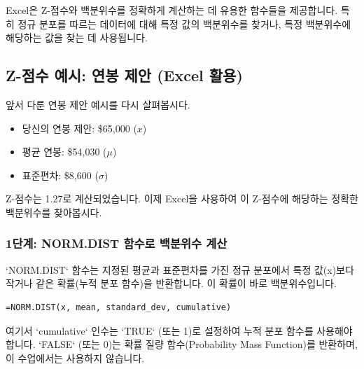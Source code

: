 \documentclass[11pt,a4paper]{article}
\begin{document}
Excel은 Z-점수와 백분위수를 정확하게 계산하는 데 유용한 함수들을 제공합니다. 특히 정규 분포를 따르는 데이터에 대해 특정 값의 백분위수를 찾거나, 특정 백분위수에 해당하는 값을 찾는 데 사용됩니다.

\subsection{Z-점수 예시: 연봉 제안 (Excel 활용)}

앞서 다룬 연봉 제안 예시를 다시 살펴봅시다.
\begin{itemize}
    \item 당신의 연봉 제안: \$65,000 (\(x\))
    \item 평균 연봉: \$54,030 (\(\mu\))
    \item 표준편차: \$8,600 (\(\sigma\))
\end{itemize}
Z-점수는 1.27로 계산되었습니다. 이제 Excel을 사용하여 이 Z-점수에 해당하는 정확한 백분위수를 찾아봅시다.

\subsubsection*{1단계: NORM.DIST 함수로 백분위수 계산}

`NORM.DIST` 함수는 지정된 평균과 표준편차를 가진 정규 분포에서 특정 값(x)보다 작거나 같은 확률(누적 분포 함수)을 반환합니다. 이 확률이 바로 백분위수입니다.

\begin{lstlisting}[caption={NORM.DIST 함수 사용법}, label={lst:norm_dist}]
=NORM.DIST(x, mean, standard_dev, cumulative)
\end{lstlisting}
여기서 `cumulative` 인수는 `TRUE` (또는 1)로 설정하여 누적 분포 함수를 사용해야 합니다. `FALSE` (또는 0)는 확률 질량 함수(Probability Mass Function)를 반환하며, 이 수업에서는 사용하지 않습니다.
\end{document}

